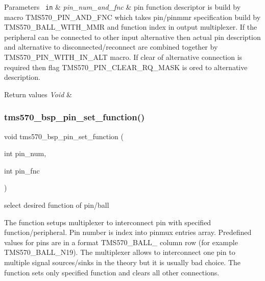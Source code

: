 \begin{DoxyParams}[1]{Parameters}
\mbox{\texttt{ in}}  & {\em pin\+\_\+num\+\_\+and\+\_\+fnc} & pin function descriptor is build by macro {\ttfamily T\+M\+S570\+\_\+\+P\+I\+N\+\_\+\+A\+N\+D\+\_\+\+F\+NC} which takes pin/pinmmr specification build by {\ttfamily T\+M\+S570\+\_\+\+B\+A\+L\+L\+\_\+\+W\+I\+T\+H\+\_\+\+M\+MR} and function index in output multiplexer. If the peripheral can be connected to other input alternative then actual pin description and alternative to disconnected/reconnect are combined together by {\ttfamily T\+M\+S570\+\_\+\+P\+I\+N\+\_\+\+W\+I\+T\+H\+\_\+\+I\+N\+\_\+\+A\+LT} macro. If clear of alternative connection is required then flag {\ttfamily T\+M\+S570\+\_\+\+P\+I\+N\+\_\+\+C\+L\+E\+A\+R\+\_\+\+R\+Q\+\_\+\+M\+A\+SK} is ored to alternative description.\\
\hline
\end{DoxyParams}

\begin{DoxyRetVals}{Return values}
{\em Void} & \\
\hline
\end{DoxyRetVals}
\mbox{\label{tms570-pinmux_8h_a096924e434015941cae44dce897ea5ef}} 
\subsubsection{\texorpdfstring{tms570\_bsp\_pin\_set\_function()}{tms570\_bsp\_pin\_set\_function()}}
{\footnotesize\ttfamily void tms570\+\_\+bsp\+\_\+pin\+\_\+set\+\_\+function (\begin{DoxyParamCaption}\item[{int}]{pin\+\_\+num,  }\item[{int}]{pin\+\_\+fnc }\end{DoxyParamCaption})}



select desired function of pin/ball 

The function setups multiplexer to interconnect pin with specified function/peripheral. Pin number is index into pinmux entries array. Predefined values for pins are in a format T\+M\+S570\+\_\+\+B\+A\+L\+L\+\_\+ {\ttfamily column} {\ttfamily row} (for example {\ttfamily T\+M\+S570\+\_\+\+B\+A\+L\+L\+\_\+\+N19}). The multiplexer allows to interconnect one pin to multiple signal sources/sinks in the theory but it is usually bad choice. The function sets only specified function and clears all other connections.



